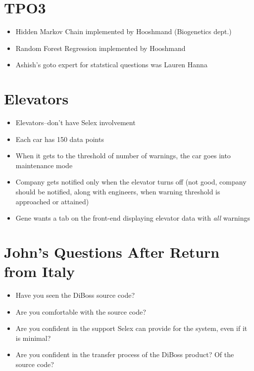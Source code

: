 \documentclass[12pt]{article}
\begin{document}
\section*{TPO3}
\begin{itemize}
	\item Hidden Markov Chain implemented by Hooshmand (Biogenetics dept.)
	\item Random Forest Regression implemented by Hooshmand
	\item Ashish's goto expert for statstical questions was Lauren Hanna
\end{itemize}
\section*{Elevators}
\begin{itemize}
	\item Elevators--don't have Selex involvement
	\item Each car has 150 data points
	\item When it gets to the threshold of number of warnings, the car goes
		into maintenance mode
	\item Company gets notified only when the elevator turns off (not good,
		company should be notified, along with engineers, when warning threshold is
		approached or attained)
	\item Gene wants a tab on the front-end displaying elevator data with
		\emph{all} warnings
\end{itemize}
\section*{John's Questions After Return from Italy}
\begin{itemize}
	\item Have you seen the DiBoss source code?
	\item Are you comfortable with the source code?
	\item Are you confident in the support Selex can provide
		for the system, even if it is minimal?
	\item Are you confident in the transfer process of the DiBoss product?
		Of the source code?
\end{itemize}
\end{document}
